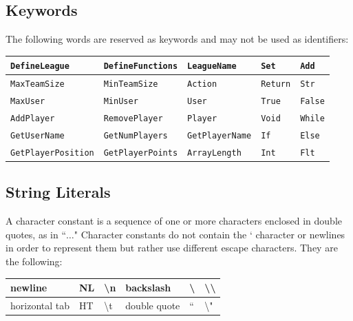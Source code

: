\documentclass[12pt]{report}
\begin{document}
\subsection{Keywords}

The following words are reserved as keywords and may not be used as identifiers:

\begin{center}
\begin{tabular}{ | l | l | l | l | l | }
\hline
\texttt{DefineLeague} & \texttt{DefineFunctions} & \texttt{LeagueName} & \texttt{Set} & \texttt{Add}\\
\hline
\texttt{MaxTeamSize} & \texttt{MinTeamSize} & \texttt{Action} & \texttt{Return} & \texttt{Str}\\
\hline
\texttt{MaxUser} & \texttt{MinUser} & \texttt{User} & \texttt{True} & \texttt{False} \\
\hline
\texttt{AddPlayer} & \texttt{RemovePlayer} & \texttt{Player} & \texttt{Void} & \texttt{While} \\
\hline
\texttt{GetUserName} & \texttt{GetNumPlayers} & \texttt{GetPlayerName} & \texttt{If} & \texttt{Else} \\
\hline
\texttt{GetPlayerPosition} & \texttt{GetPlayerPoints} & \texttt{ArrayLength} & \texttt{Int} & \texttt{Flt}\\
\hline
\end{tabular}
\end{center}

\subsection{String Literals}

A character constant is a sequence of one or more characters enclosed in double quotes, as in ``$\ldots$" Character constants do not contain the ` character or newlines in order to represent them but rather use different escape characters. They are the following:

\begin{center}
\begin{tabular}{ | l | l | l | l | l | l | }
\hline
newline & NL & \textbackslash{n} & backslash & \textbackslash & \textbackslash\textbackslash \\
\hline
horizontal tab & HT & \textbackslash{t} & double quote & `` & \textbackslash" \\
\hline
\end{tabular}
\end{center}
\end{document}
